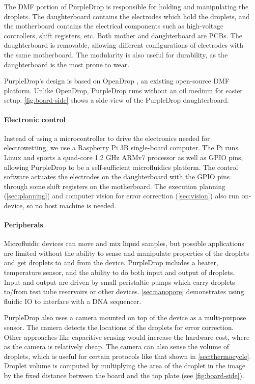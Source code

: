 \documentclass{jpaper}
\begin{document}
The DMF portion of PurpleDrop is responsible for holding and manipulating the droplets.
The daughterboard contains the electrodes which hold the droplets, and the motherboard contains the electrical components such as high-voltage controllers, shift registers, etc.
Both mother and daughterboard are PCBs.
The daughterboard is removable, allowing different configurations of electrodes with the same motherboard.
The modularity is also useful for durability, as the daughterboard is the most prone to wear.

PurpleDrop's design is based on OpenDrop \cite{opendrop}, an existing open-source DMF platform.
Unlike OpenDrop, PurpleDrop runs without an oil medium for easier setup.
\autoref{fig:board-side} shows a side view of the PurpleDrop daughterboard.

\paragraph{Electronic control}

Instead of using a microcontroller to drive the electronics needed for electrowetting, we use a Raspberry Pi 3B \cite{raspberry-pi-3b} single-board computer.
The Pi runs Linux and sports a quad-core 1.2 GHz ARMv7 processor as well as GPIO pins, allowing PurpleDrop to be a self-sufficient microfluidics platform.
The control software actuates the electrodes on the daughterboard with the GPIO pins through some shift registers on the motherboard.
The execution planning (\autoref{sec:planning}) and computer vision for error correction (\autoref{sec:vision}) also run on-device, so no host machine is needed.

\paragraph{Peripherals}

Microfluidic devices can move and mix liquid samples, but possible applications are limited without the ability to sense and manipulate properties of the droplets and get droplets to and from the device.
PurpleDrop includes a heater, temperature sensor, and the ability to do both input and output of droplets.
Input and output are driven by small peristaltic pumps which carry droplets to/from test tube reservoirs or other devices.
\autoref{sec:nanopore} demonstrates using fluidic IO to interface with a DNA sequencer.

PurpleDrop also uses a camera mounted on top of the device as a multi-purpose sensor.
The camera detects the locations of the droplets for error correction.
Other approaches like capacitive sensing \cite{bhattacharjee2012capacitance} would increase the hardware cost, where as the camera is relatively cheap.
The camera can also sense the volume of droplets, which is useful for certain protocols like that shown in \autoref{sec:thermocycle}.
Droplet volume is computed by multiplying the area of the droplet in the image by the fixed distance between the board and the top plate (see \autoref{fig:board-side}).
\end{document}
